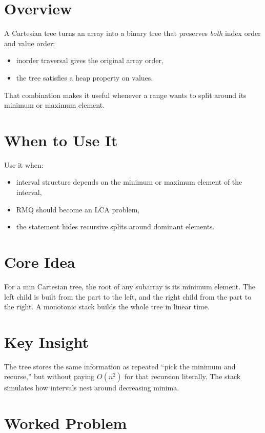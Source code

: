 \section*{Overview}

A Cartesian tree turns an array into a binary tree that preserves \emph{both} index order and value order:

\begin{itemize}
  \item inorder traversal gives the original array order,
  \item the tree satisfies a heap property on values.
\end{itemize}

That combination makes it useful whenever a range wants to split around its minimum or maximum element.

\section*{When to Use It}

Use it when:

\begin{itemize}
  \item interval structure depends on the minimum or maximum element of the interval,
  \item RMQ should become an LCA problem,
  \item the statement hides recursive splits around dominant elements.
\end{itemize}

\section*{Core Idea}

For a min Cartesian tree, the root of any subarray is its minimum element. The left child is built from the part to the
left, and the right child from the part to the right. A monotonic stack builds the whole tree in linear time.

\section*{Key Insight}

The tree stores the same information as repeated ``pick the minimum and recurse,'' but without paying \(O(n^2)\) for
that recursion literally. The stack simulates how intervals nest around decreasing minima.

\section*{Worked Problem}

